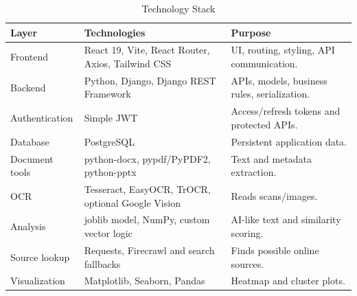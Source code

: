 \documentclass[12pt, a4paper]{report}
\numberwithin{equation}{chapter}
\begin{document}
\begin{table}[htbp]
    \centering
    \caption{Technology Stack}
    \label{tab:technology-stack}
    \renewcommand{\arraystretch}{1.3}
    
    \begin{tabularx}{\textwidth}{|>{\raggedright\arraybackslash}p{2.5cm}|
                                  >{\raggedright\arraybackslash}p{5.2cm}|
                                  X|}
        \hline
        \textbf{Layer} & \textbf{Technologies} & \textbf{Purpose} \\
        \hline
        Frontend 
        & React 19, Vite, React Router, Axios, Tailwind CSS 
        & UI, routing, styling, API communication. \\
        \hline
        
        Backend 
        & Python, Django, Django REST Framework 
        & APIs, models, business rules, serialization. \\
        \hline
        
        Authentication 
        & Simple JWT 
        & Access/refresh tokens and protected APIs. \\
        \hline
        
        Database 
        & PostgreSQL 
        & Persistent application data. \\
        \hline
        
        Document tools 
        & python-docx, pypdf/PyPDF2, python-pptx 
        & Text and metadata extraction. \\
        \hline
        
        OCR 
        & Tesseract, EasyOCR, TrOCR, optional Google Vision 
        & Reads scans/images. \\
        \hline
        
        Analysis 
        & joblib model, NumPy, custom vector logic 
        & AI-like text and similarity scoring. \\
        \hline
        
        Source lookup 
        & Requests, Firecrawl and search fallbacks 
        & Finds possible online sources. \\
        \hline
        
        Visualization 
        & Matplotlib, Seaborn, Pandas 
        & Heatmap and cluster plots. \\
        \hline
    \end{tabularx}
\end{table}
\end{document}
